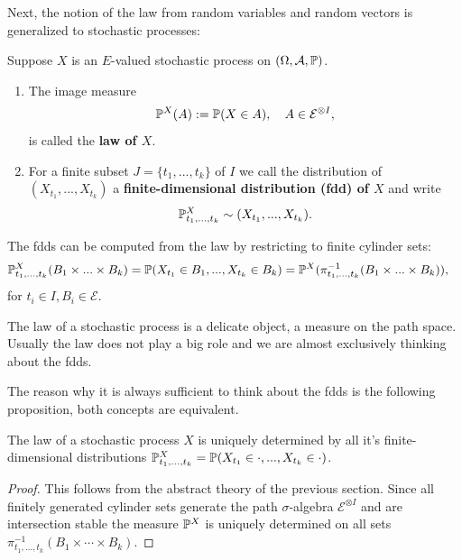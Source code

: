 Next, the notion of the law from random variables and random vectors is generalized to stochastic processes:
\begin{ldef}
\begin{deff}\label{def:SP}
		Suppose $X$ is an $E$-valued stochastic process on $(\Omega, \mathcal A, \P)$. 
		\begin{enumerate}[label=(\roman*)]
			\item The image measure 		
		\begin{align*}
			\P^X(A):=\P(X\in A),\quad A\in \mathcal E^{\otimes I},
		\end{align*}
		is called the \textbf{law of $X$}.
		\item For a finite subset $J=\{t_1,...,t_k\}$ of $I$ we call the distribution of $(X_{t_1},...,X_{t_k})$ a \textbf{finite-dimensional distribution (fdd) of $X$} and write
		\begin{align*}		
			\P^X_{t_1,...,t_k}\sim (X_{t_1},...,X_{t_k}).
		\end{align*}
	\end{enumerate}
\end{deff}
\end{ldef}
The fdds can be computed from the law by restricting to finite cylinder sets:
\begin{align*}
	\P^X_{t_1,...,t_k}(B_1\times ...\times B_k)=\P(X_{t_1}\in B_1,..., X_{t_k}\in B_k)
&=\P^X(\pi_{t_1,...,t_k}^{-1}(B_1\times ... \times B_k)),
\end{align*}
for $t_i\in I, B_i\in \mathcal E$.
\begin{lWarnhinweis}
	The law of a stochastic process is a delicate object, a measure on the path space. Usually the law does not play a big role	and we are almost exclusively thinking about the fdds.
\end{lWarnhinweis}
The reason why it is always sufficient to think about the fdds is the following proposition, both concepts are equivalent.
\begin{laussagewerkzeug}
\begin{prop}
		The law of a stochastic process $X$ is uniquely determined by all it's finite-dimensional distributions $\P^X_{t_1,...,t_k}=\P(X_{t_1}\in \cdot, ..., X_{t_k}\in \cdot)$.
\end{prop}
\end{laussagewerkzeug}
\begin{proof}[Proof]
	This follows from the abstract theory of the previous section. Since all finitely generated cylinder sets generate the path $\sigma$-algebra $\mathcal E^{\otimes I}$ and are intersection stable the measure $\P^X$ is uniquely determined on all sets $\pi_{t_1,...,t_k}^{-1}(B_1\times \cdots \times B_k)$.
\end{proof}

